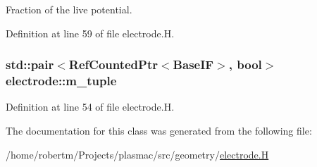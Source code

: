 Fraction of the live potential. 



Definition at line 59 of file electrode.\+H.

\subsubsection[{\texorpdfstring{m\+\_\+tuple}{m_tuple}}]{\setlength{\rightskip}{0pt plus 5cm}std\+::pair$<$Ref\+Counted\+Ptr$<$Base\+IF$>$, bool$>$ electrode\+::m\+\_\+tuple\hspace{0.3cm}{\ttfamily [protected]}}\hypertarget{classelectrode_ac9bfa0ff9293a90eb5dd6ea437d02109}{}\label{classelectrode_ac9bfa0ff9293a90eb5dd6ea437d02109}


Definition at line 54 of file electrode.\+H.



The documentation for this class was generated from the following file\+:\begin{DoxyCompactItemize}
\item 
/home/robertm/\+Projects/plasmac/src/geometry/\hyperlink{electrode_8H}{electrode.\+H}\end{DoxyCompactItemize}
